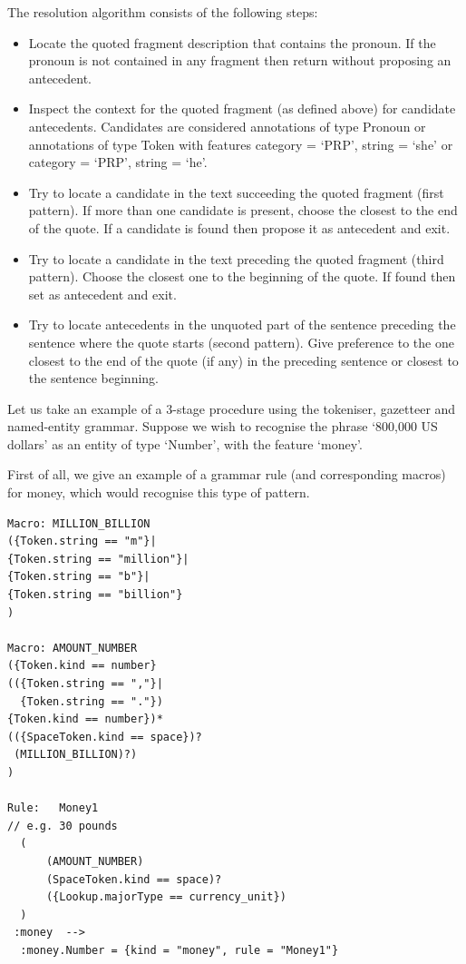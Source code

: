The resolution algorithm consists of the following steps:
  \begin{itemize}
  \item
  Locate the quoted fragment description that contains the pronoun. If
  the pronoun is not contained in any fragment then return without
  proposing an antecedent.

  \item
  Inspect the context for the quoted fragment (as defined above) for
  candidate antecedents. Candidates are considered annotations of type
  Pronoun or annotations of type Token with features {category =
  `PRP', string = `she'} or {category = `PRP', string = `he'}.

  \item
  Try to locate a candidate in the text succeeding the quoted fragment
  (first pattern). If more than one candidate is present, choose the
  closest to the end of the quote. If a candidate is found then
  propose it as antecedent and exit.

  \item
  Try to locate a candidate in the text preceding the quoted fragment
  (third pattern). Choose the closest one to the beginning of the
  quote. If found then set as antecedent and exit.

  \item
  Try to locate antecedents in the unquoted part of the sentence
  preceding the sentence where the quote starts (second pattern). Give
  preference to the one closest to the end of the quote (if any) in
  the preceding sentence or closest to the sentence beginning.
  \end{itemize}




Let us take an example of a 3-stage procedure using the tokeniser, gazetteer
and named-entity grammar. Suppose we wish to recognise the phrase
`800,000 US dollars' as an entity of type `Number', with the
feature `money'.

First of all, we give an example of a grammar rule (and corresponding
macros) for money, which would recognise this type of pattern.

\begin{small}
\begin{verbatim}
Macro: MILLION_BILLION
({Token.string == "m"}|
{Token.string == "million"}|
{Token.string == "b"}|
{Token.string == "billion"}
)

Macro: AMOUNT_NUMBER
({Token.kind == number}
(({Token.string == ","}|
  {Token.string == "."})
{Token.kind == number})*
(({SpaceToken.kind == space})?
 (MILLION_BILLION)?)
)

Rule:	Money1
// e.g. 30 pounds
  (
      (AMOUNT_NUMBER)
      (SpaceToken.kind == space)?
      ({Lookup.majorType == currency_unit})
  )
 :money  -->
  :money.Number = {kind = "money", rule = "Money1"}
\end{verbatim}
\end{small}


